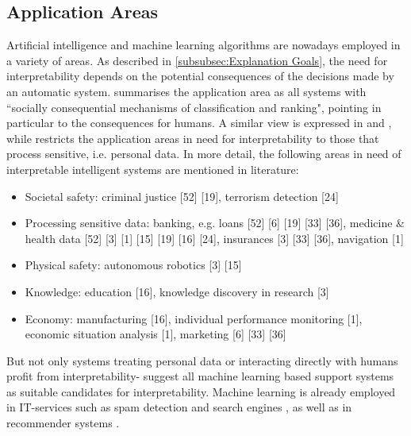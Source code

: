 \subsection{Application Areas}
Artificial intelligence and machine learning algorithms are nowadays employed in a variety of areas. As described in \ref{subsubsec:Explanation Goals}, the need for interpretability depends on the potential consequences of the decisions made by an automatic system. \cite{burrell2016machine} summarises the application area as all systems with ``socially consequential mechanisms of classification and ranking", pointing in particular to the consequences for humans. A similar view is expressed in \cite{poursabzi2017manipulating} and \cite{ribeiro2016should}, while \cite{guidotti2018survey} restricts the application areas in need for interpretability to those that process sensitive, i.e. personal data. In more detail, the following areas in need of interpretable intelligent systems are mentioned in literature:
\begin{itemize}
	\item Societal safety: criminal justice [52] [19], terrorism detection [24]	
	\item Processing sensitive data: banking, e.g. loans [52] [6] [19] [33] [36], medicine \& health data [52] [3] [1] [15] [19] [16] [24], insurances [3] [33] [36], navigation [1]
	\item Physical safety: autonomous robotics [3] [15]
	\item Knowledge: education [16], knowledge discovery in research [3]	
	\item Economy: manufacturing [16], individual performance monitoring [1], economic situation analysis [1], marketing [6] [33] [36]	
\end{itemize}
But not only systems treating personal data or interacting directly with humans profit from interpretability- \cite{ventocilla2018taxonomy} suggest all machine learning based support systems as suitable candidates for interpretability. Machine learning is already employed in IT-services such as spam detection and search engines \cite{burrell2016machine} \cite{domingos2012few}, as well as in recommender systems \cite{gilpin2018explaining} \cite{richardson2018survey}.\newline
